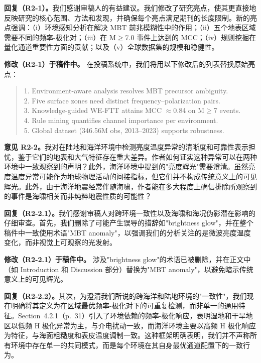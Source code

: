 \documentclass[12pt]{article}
\newcommand{\revcomment}[1]{\begingroup\color{commentcolor}#1\endgroup}
\newcommand{\revresponse}[1]{\begingroup\color{responsecolor}#1\endgroup}
\newcommand{\revchange}[1]{\begingroup\color{changecolor}#1\endgroup}
\begin{document}
\revresponse{%
\textbf{回复（R2-1）。}我们感谢审稿人的有益建议。我们修改了研究亮点，使其更直接地反映研究的核心范围、方法和发现，并确保每个亮点满足期刊的长度限制。新的亮点强调：（i）环境感知分析在解决 MBT 前兆模糊性中的作用；（ii）五个地表区域需要不同的频率-极化对；（iii）在 M$\ge$7.0 事件上达到的 MCC；（iv）规则挖掘在量化通道重要性方面的贡献；以及（v）全球数据集的规模和稳健性。
}

\revchange{%
\textbf{修改（R2-1）于稿件中。}
在投稿系统中，我们将用以下修改后的列表替换原始亮点：

\begin{quote}
1. Environment-aware analysis resolves MBT precursor ambiguity.\\
2. Five surface zones need distinct frequency--polarization pairs.\\
3. Knowledge-guided WE-FTT attains MCC $\approx$0.84 on M$\ge$7 events.\\
4. Rule mining quantifies channel importance per environment.\\
5. Global dataset (346.56M obs, 2013--2023) supports robustness.
\end{quote}
}

\bigskip

\revcomment{%
\textbf{意见 R2-2。}我对在陆地和海洋环境中检测亮度温度异常的清晰度和可靠性表示担忧，鉴于它们的地表和大气特征存在重大差异。作者如何证实这种异常可以在两种环境中一致观察到的声明？此外，海洋环境中提到的"亮度辉光"需要澄清。虽然亮度温度异常可能作为地球物理活动的间接指标，但它们并不构成传统意义上的可见辉光。此外，由于海洋地震经常伴随海啸，作者能在多大程度上确信排除所观察到的事件是海啸相关而非纯粹地震性质的可能性？
}

\revresponse{%
\textbf{回复（R2-2.1）。}我们感谢审稿人对跨环境一致性以及海啸和海况伪影潜在影响的仔细审查。首先，我们删除了可能产生误导的措辞如"brightness glow"，并在整个稿件中一致使用术语"MBT anomaly"，以强调我们的分析关注的是微波亮度温度变化，而非视觉上可观察的光发射。
}

\revchange{%
\textbf{修改（R2-2.1）于稿件中。}
涉及"brightness glow"的术语已被删除，并在正文中（如 Introduction 和 Discussion 部分）替换为"MBT anomaly"，以避免暗示传统意义上的可见辉光。}

\revresponse{%
\textbf{回复（R2-2.2）。}其次，为澄清我们所说的跨海洋和陆地环境的"一致性"，我们现在明确将其定义为在区域最优频率-极化对下的可重复检测，而非单一的通用特征。Section~4.2.1（p.~31）引入了环境依赖的频率-极化响应，表明湿地和干旱地区以低频 H 极化异常为主，与介电扰动一致，而海洋环境主要以高频 H 极化响应为特征，与海面粗糙度和表皮温度调制一致。这种框架明确表明，我们并不声称所有环境中存在单一的共同模式，而是每个环境在其自身最优通道配置下的一致行为。
}
\end{document}
